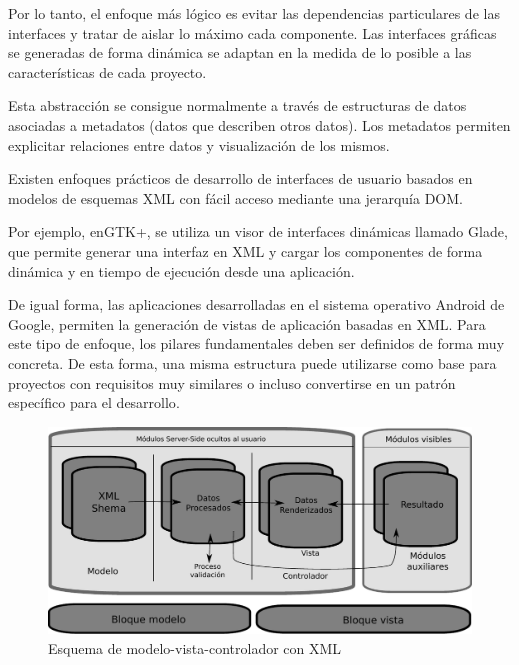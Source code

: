 Por lo tanto, el enfoque más lógico es evitar las dependencias particulares de las
interfaces y tratar de aislar lo máximo cada componente. Las interfaces gráficas
se generadas de forma dinámica se adaptan en la medida de lo posible a las
características de cada proyecto.

Esta abstracción se consigue normalmente a través de estructuras de datos
asociadas a metadatos (datos que describen otros datos). Los metadatos permiten
explicitar relaciones entre datos y visualización de los mismos.

Existen enfoques prácticos de desarrollo de interfaces de usuario basados en
modelos de esquemas XML\cite{IEE05} con fácil acceso mediante una jerarquía
\acs{DOM}\label{acro:DOM}\cite{W3C00}.

Por ejemplo, en\acs{GTK+}\label{acro:GTK+}, se utiliza un visor de interfaces
dinámicas llamado Glade, que permite generar una interfaz en XML\cite{ZaM06} y cargar los componentes de
forma dinámica y en tiempo de ejecución desde una aplicación.

De igual forma, las aplicaciones desarrolladas en el sistema operativo Android
de Google, permiten la generación de vistas de aplicación basadas en XML. Para
este tipo de enfoque, los pilares fundamentales deben ser definidos de forma 
muy concreta. De esta forma, una misma estructura puede utilizarse como
base para proyectos con requisitos muy similares o incluso convertirse en
un patrón específico para el desarrollo\cite{LoM99}.

\newpage

\begin{figure}[ht]
    \begin{center}
        \includegraphics[width=460px]{src/img/diagrams/esquema-modulos-xml.pdf}
        \caption[Esquema de modelo-vista-controlador con XML] 
        {Esquema de modelo-vista-controlador con XML}
        \label{fig:esquemaXML}
    \end{center}
\end{figure}

